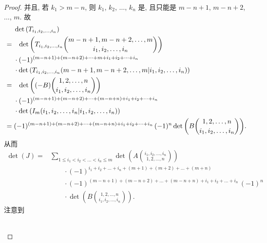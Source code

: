 \begin{proof}
    并且, 若 \(k_1 > m-n\),
    则 \(k_1\), \(k_2\), \(\dots\), \(k_n\)
    是, 且只能是
    \(m-n+1\), \(m-n+2\), \(\dots\), \(m\).
    故
    \begin{align*}
             & \det {(T_{i_1,i_2,\dots,i_n})}
        \\
        = {} &
        \hphantom{\cdot\,\,}
        \det {\left(
            T_{i_1,i_2,\dots,i_n}
            \binom{m-n+1,m-n+2,\dots,m}{i_1,i_2,\dots,i_n}
            \right)}
        \\
             &
        \cdot (-1)^{(m-n+1) + (m-n+2) + \dots + m
            + i_1 + i_2 + \dots + i_n}
        \\
             &
        \cdot
        \det {(T_{i_1,i_2,\dots,i_n}
        ({m-n+1,m-n+2,\dots,m}|{i_1,i_2,\dots,i_n}))}
        \\
        = {} &
        \hphantom{\cdot\,\,}
        \det {\left(
            (-B)
            \binom{1,2,\dots,n}{i_1,i_2,\dots,i_n}
            \right)}
        \\
             & \cdot
        (-1)^{(m-n+1) + (m-n+2) + \dots + (m-n+n)
            + i_1 + i_2 + \dots + i_n}
        \\
             & \cdot
        \det {(I_m
        ({i_1,i_2,\dots,i_n}|{i_1,i_2,\dots,i_n}))}
        \\
        = {} &
        (-1)^{(m-n+1) + (m-n+2) + \dots + (m-n+n)
                + i_1 + i_2 + \dots + i_n}\,
        (-1)^n
        \det {\left(
            B
            \binom{1,2,\dots,n}{i_1,i_2,\dots,i_n}
            \right)}.
    \end{align*}
    从而
    \begin{align*}
        \det {(J)}
        = {} & \sum_{1 \leq i_1 < i_2 < \dots < i_n \leq m}
        {\det {\left(
                A\binom{i_1,i_2,\dots,i_n}{1,2,\dots,n}
                \right)}}
        \\
             & \qquad
        \cdot
        (-1)^{i_1 + i_2 + \dots + i_n
            + (m+1) + (m+2) + \dots + (m+n)}
        \\
             & \qquad
        \cdot
        (-1)^{(m-n+1) + (m-n+2) + \dots + (m-n+n)
            + i_1 + i_2 + \dots + i_n}\, (-1)^n
        \\
             & \qquad
        \cdot
        \det {\left(
            B
            \binom{1,2,\dots,n}{i_1,i_2,\dots,i_n}
            \right)}.
    \end{align*}
    注意到
    \begin{align*}
             &
        \hphantom{\cdot\,\,}

\end{align*}
\end{proof}
